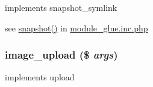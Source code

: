 implements snapshot\_\-symlink

see \hyperlink{module__glue_8inc_8php_5d3ad02088eee566589cd47fe0dc889a}{snapshot()} in \hyperlink{module__glue_8inc_8php}{module\_\-glue.inc.php} \hypertarget{module__image_8inc_8php_37dee9de60e2852c0631d8e60e58585c}{
\subsubsection[{image\_\-upload}]{\setlength{\rightskip}{0pt plus 5cm}image\_\-upload (\$ {\em args})}}
\label{module__image_8inc_8php_37dee9de60e2852c0631d8e60e58585c}


implements upload 